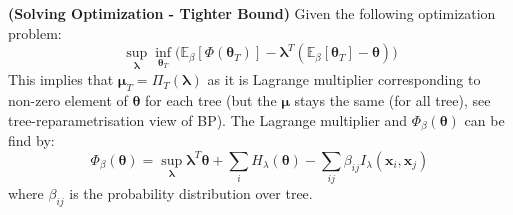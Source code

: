 \begin{proposition}{\textbf{(Solving Optimization - Tighter Bound)}}
    Given the following optimization problem:
    \begin{equation*}
        \sup_{\boldsymbol \lambda}\inf_{\boldsymbol \theta_T} \Big(\mathbb{E}_\beta[\Phi(\boldsymbol \theta_T)] - \boldsymbol\lambda^T(\mathbb{E}_\beta[\boldsymbol \theta_T] - \boldsymbol \theta)\Big)
    \end{equation*}
    This implies that $\boldsymbol \mu_T = \Pi_T(\boldsymbol\lambda)$ as it is Lagrange multiplier corresponding to non-zero element of $\boldsymbol \theta$ for each tree (but the $\boldsymbol \mu$ stays the same (for all tree), see tree-reparametrisation view of BP). The Lagrange multiplier and $\Phi_\beta(\boldsymbol \theta)$ can be find by:
    \begin{equation*}
        \Phi_\beta(\boldsymbol \theta) = \sup_{\boldsymbol \lambda} \boldsymbol \lambda^T\boldsymbol \theta + \sum_i H_\lambda(\boldsymbol \theta) - \sum_{ij}\beta_{ij}I_\lambda(\boldsymbol x_i, \boldsymbol x_j)
    \end{equation*}
    where $\beta_{ij}$ is the probability distribution over tree. 
\end{proposition}
